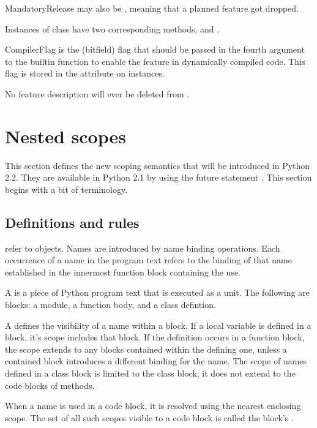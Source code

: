 MandatoryRelease may also be , meaning that a planned
feature got dropped.

Instances of class  have two corresponding methods,
 and .

CompilerFlag is the (bitfield) flag that should be passed in the
fourth argument to the builtin function  to enable
the feature in dynamically compiled code.  This flag is stored in the
 attribute on  instances.

No feature description will ever be deleted from .

\section{Nested scopes \label{nested-scopes}}

This section defines the new scoping semantics that will be introduced
in Python 2.2.  They are available in Python 2.1 by using the future
statement .  This section begins with a bit of
terminology. 

\subsection{Definitions and rules \label{definitions}}

 refer to objects.  Names are introduced by name binding
operations.  Each occurrence of a name in the program text refers to
the binding of that name established in the innermost function block
containing the use.

A  is a piece of Python program text that is executed as
a unit.  The following are blocks: a module, a function body, and a
class defintion.

A  defines the visibility of a name within a block.  If a
local variable is defined in a block, it's scope includes that block.
If the definition occurs in a function block, the scope extends to any
blocks contained within the defining one, unless a contained block
introduces a different binding for the name.  The scope of names
defined in a class block is limited to the class block; it does not
extend to the code blocks of methods.

When a name is used in a code block, it is resolved using the nearest
enclosing scope.  The set of all such scopes visible to a code block
is called the block's .  


